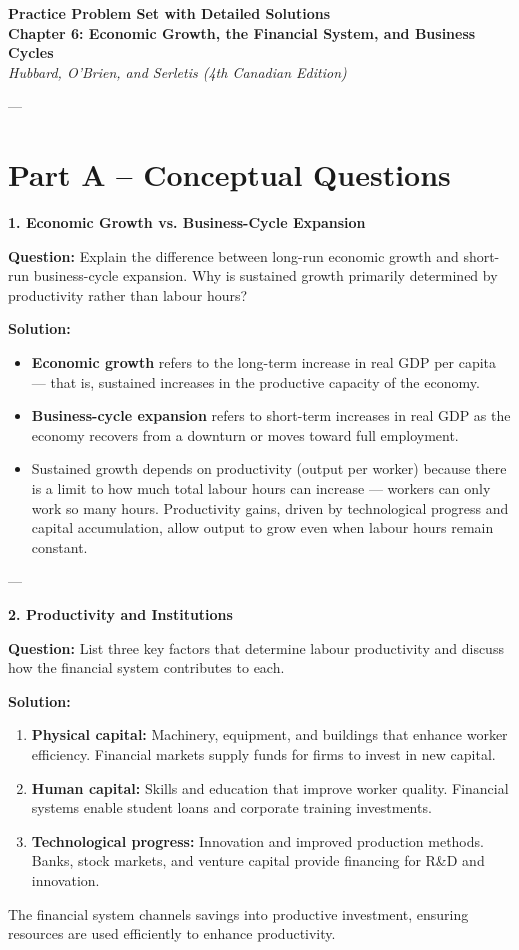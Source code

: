 \documentclass[12pt]{article}
\begin{document}
\begin{center}
\Large \textbf{Practice Problem Set with Detailed Solutions}\\[4pt]
\large \textbf{Chapter 6: Economic Growth, the Financial System, and Business Cycles}\\
\textit{Hubbard, O'Brien, and Serletis (4th Canadian Edition)}
\end{center}

---

\section*{Part A – Conceptual Questions}

\textbf{1. Economic Growth vs. Business-Cycle Expansion}

\textbf{Question:}  
Explain the difference between long-run economic growth and short-run business-cycle expansion. Why is sustained growth primarily determined by productivity rather than labour hours?

\textbf{Solution:}  
\begin{itemize}
\item \textbf{Economic growth} refers to the long-term increase in real GDP per capita — that is, sustained increases in the productive capacity of the economy.
\item \textbf{Business-cycle expansion} refers to short-term increases in real GDP as the economy recovers from a downturn or moves toward full employment.
\item Sustained growth depends on productivity (output per worker) because there is a limit to how much total labour hours can increase — workers can only work so many hours. Productivity gains, driven by technological progress and capital accumulation, allow output to grow even when labour hours remain constant.
\end{itemize}

---

\textbf{2. Productivity and Institutions}

\textbf{Question:}  
List three key factors that determine labour productivity and discuss how the financial system contributes to each.

\textbf{Solution:}  
\begin{enumerate}
    \item \textbf{Physical capital:} Machinery, equipment, and buildings that enhance worker efficiency. Financial markets supply funds for firms to invest in new capital.
    \item \textbf{Human capital:} Skills and education that improve worker quality. Financial systems enable student loans and corporate training investments.
    \item \textbf{Technological progress:} Innovation and improved production methods. Banks, stock markets, and venture capital provide financing for R\&D and innovation.
\end{enumerate}
The financial system channels savings into productive investment, ensuring resources are used efficiently to enhance productivity.
\end{document}
